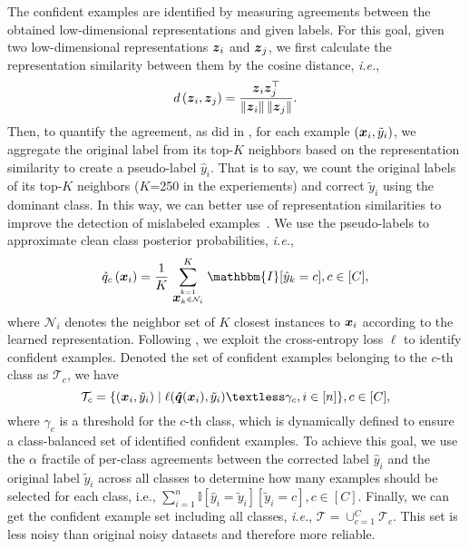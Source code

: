 \documentclass[10pt,twocolumn,letterpaper]{article}
\newcommand{\bm}[1]{\mbox{\boldmath{$#1$}}}
\begin{document}
The confident examples are identified by measuring agreements between the obtained low-dimensional representations and given labels. For this goal, given two low-dimensional representations $\bm{z}_i$ and $\bm{z}_j$, we first calculate the representation similarity between them by the cosine distance, \textit{i.e.},
\begin{equation}\label{eq:re_sim}
	d\left(\bm{z}_{i}, \bm{z}_{j}\right)=\frac{\bm{z}_{i}\bm{z}_{j}^{\top}}{\left\|\bm{z}_{i}\right\|\left\|\bm{z}_{j}\right\|}.
\end{equation}
Then, to quantify the agreement, as did in \cite{Ortego2021}, for each example $(\bm{x}_i,\tilde{y}_i)$, we aggregate the original label from its top-$K$ neighbors based on the representation similarity to create a pseudo-label $\hat{y}_i$. That is to say, we count the original labels of its top-$K$ neighbors ($K$=250 in the experiements) and correct $\tilde{y}_i$ using the dominant class. In this way, we can better use of representation similarities to improve the detection of mislabeled examples~\cite{Ortego2021}. We use the pseudo-labels to approximate clean class posterior probabilities, \textit{i.e.}, \begin{equation}
	\hat{q}_c\left(\bm{x}_{i}\right)=\frac{1}{K} \sum_{k=1 \atop \bm{x}_{k} \in \mathcal{N}_{i}}^{K} \mathbbm{I}[\hat{y}_{k} = c], c\in[C],
\end{equation}	
where $\mathcal{N}_{i}$ denotes the neighbor set of $K$ closest instances to $\bm{x}_i$ according to the learned representation. Following \cite{Han2018NIPS}, we exploit the cross-entropy loss $\ell$ to identify confident examples. Denoted the set of confident examples belonging to the $c$-th class as $\mathcal{T}_c$, we have 
\begin{equation}
	\mathcal{T}_c=\{(\bm{x}_i,\tilde{y}_i)\mid \ell(\bm{\hat{q}}(\bm{x}_i), \tilde{y}_i)\textless \gamma_c, i \in [n] \}, c\in[C],
	\label{class_label}
\end{equation}	
where $\gamma_c$ is a threshold for the $c$-th class, which is dynamically defined to ensure a class-balanced set of identified confident examples. To achieve this goal, we use the $\alpha$ fractile of per-class agreements between the corrected label $\hat{y}_i$ and the original label $\tilde{y}_i$ across all classes to determine how many examples should be selected for each class, i.e., $\sum_{i=1}^n \mathbb{I}[\hat{y}_{i}=\tilde{y}_{i}][\tilde{y}_{i}=c], c \in[C]$. Finally, we can get the confident example set including all classes, \textit{i.e.}, $\mathcal{T}= \cup_{c=1}^{C} \mathcal{T}_c$. This set is less noisy than original noisy datasets and therefore more reliable.
\end{document}
